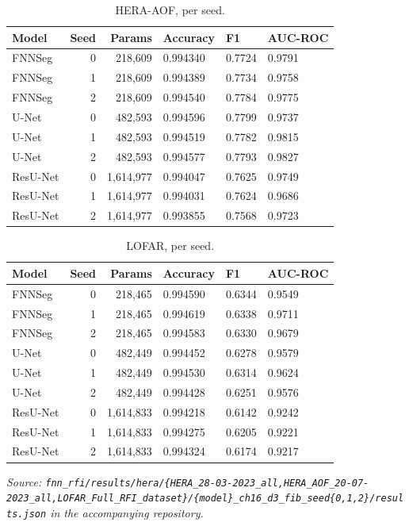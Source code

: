 \documentclass[11pt]{article}
\begin{document}
\begin{table}[h]
\centering
\caption{HERA-AOF, per seed.}
\begin{tabular}{lrrlll}
\toprule
Model & Seed & Params & Accuracy & F1 & AUC-ROC \\
\midrule
FNNSeg & 0 & 218,609 & 0.994340 & 0.7724 & 0.9791 \\
FNNSeg & 1 & 218,609 & 0.994389 & 0.7734 & 0.9758 \\
FNNSeg & 2 & 218,609 & 0.994540 & 0.7784 & 0.9775 \\
U-Net & 0 & 482,593 & 0.994596 & 0.7799 & 0.9737 \\
U-Net & 1 & 482,593 & 0.994519 & 0.7782 & 0.9815 \\
U-Net & 2 & 482,593 & 0.994577 & 0.7793 & 0.9827 \\
ResU-Net & 0 & 1,614,977 & 0.994047 & 0.7625 & 0.9749 \\
ResU-Net & 1 & 1,614,977 & 0.994031 & 0.7624 & 0.9686 \\
ResU-Net & 2 & 1,614,977 & 0.993855 & 0.7568 & 0.9723 \\
\bottomrule
\end{tabular}
\end{table}

\begin{table}[h]
\centering
\caption{LOFAR, per seed.}
\begin{tabular}{lrrlll}
\toprule
Model & Seed & Params & Accuracy & F1 & AUC-ROC \\
\midrule
FNNSeg & 0 & 218,465 & 0.994590 & 0.6344 & 0.9549 \\
FNNSeg & 1 & 218,465 & 0.994619 & 0.6338 & 0.9711 \\
FNNSeg & 2 & 218,465 & 0.994583 & 0.6330 & 0.9679 \\
U-Net & 0 & 482,449 & 0.994452 & 0.6278 & 0.9579 \\
U-Net & 1 & 482,449 & 0.994530 & 0.6314 & 0.9624 \\
U-Net & 2 & 482,449 & 0.994428 & 0.6251 & 0.9576 \\
ResU-Net & 0 & 1,614,833 & 0.994218 & 0.6142 & 0.9242 \\
ResU-Net & 1 & 1,614,833 & 0.994275 & 0.6205 & 0.9221 \\
ResU-Net & 2 & 1,614,833 & 0.994324 & 0.6174 & 0.9217 \\
\bottomrule
\end{tabular}
\end{table}

\emph{Source: \texttt{fnn\_rfi/results/hera/\{HERA\_28-03-2023\_all,HERA\_AOF\_20-07-2023\_all,LOFAR\_Full\_RFI\_dataset\}/\{model\}\_ch16\_d3\_fib\_seed\{0,1,2\}/results.json} in the accompanying repository.}
\end{document}
